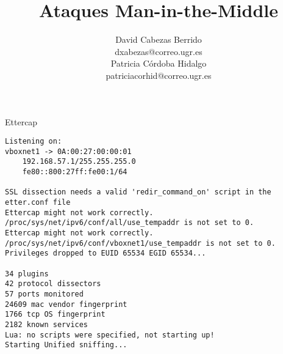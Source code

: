 \documentclass{article}
\title{\Huge Ataques Man-in-the-Middle \vspace{10mm}}
\author{\Large David Cabezas Berrido \vspace{5mm} \\ 
  \Large dxabezas@correo.ugr.es \vspace{10mm} \\
  \Large Patricia Córdoba Hidalgo \vspace{5mm} \\ 
	\Large patriciacorhid@correo.ugr.es \vspace{10mm}}
\begin{document}
\maketitle
\tableofcontents
\newpage

Ettercap

\begin{Verbatim}[tabsize=4]
Listening on:
vboxnet1 -> 0A:00:27:00:00:01
	192.168.57.1/255.255.255.0
	fe80::800:27ff:fe00:1/64

SSL dissection needs a valid 'redir_command_on' script in the etter.conf file
Ettercap might not work correctly. /proc/sys/net/ipv6/conf/all/use_tempaddr is not set to 0.
Ettercap might not work correctly. /proc/sys/net/ipv6/conf/vboxnet1/use_tempaddr is not set to 0.
Privileges dropped to EUID 65534 EGID 65534...

34 plugins
42 protocol dissectors
57 ports monitored
24609 mac vendor fingerprint
1766 tcp OS fingerprint
2182 known services
Lua: no scripts were specified, not starting up!
Starting Unified sniffing...
\end{Verbatim}
\end{document}
